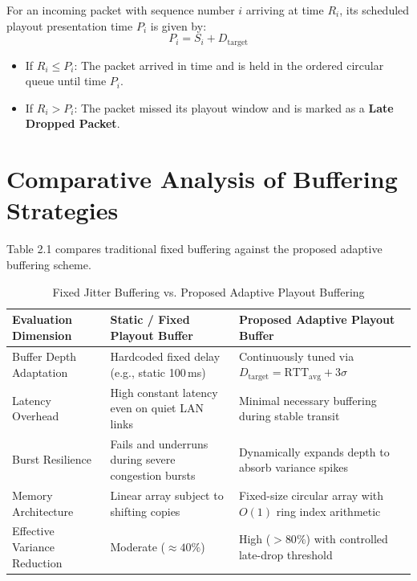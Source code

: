 \documentclass[12pt, a4paper]{report}
\begin{document}
For an incoming packet with sequence number $i$ arriving at time $R_i$, its scheduled playout presentation time $P_i$ is given by:
\begin{equation}
P_i = S_i + D_{\text{target}}
\end{equation}
\begin{itemize}
    \item If $R_i \le P_i$: The packet arrived in time and is held in the ordered circular queue until time $P_i$.
    \item If $R_i > P_i$: The packet missed its playout window and is marked as a \textbf{Late Dropped Packet}.
\end{itemize}

\section{Comparative Analysis of Buffering Strategies}
Table 2.1 compares traditional fixed buffering against the proposed adaptive buffering scheme.

\begin{table}[H]
\centering
\begin{tabularx}{\textwidth}{|p{3.5cm}|L|L|}
\hline
\textbf{Evaluation Dimension} & \textbf{Static / Fixed Playout Buffer} & \textbf{Proposed Adaptive Playout Buffer} \\
\hline
Buffer Depth Adaptation & Hardcoded fixed delay (e.g., static 100\,ms) & Continuously tuned via $D_{\text{target}} = \text{RTT}_{\text{avg}} + 3\sigma$ \\
\hline
Latency Overhead & High constant latency even on quiet LAN links & Minimal necessary buffering during stable transit \\
\hline
Burst Resilience & Fails and underruns during severe congestion bursts & Dynamically expands depth to absorb variance spikes \\
\hline
Memory Architecture & Linear array subject to shifting copies & Fixed-size circular array with $O(1)$ ring index arithmetic \\
\hline
Effective Variance Reduction & Moderate ($\approx 40\%$) & High ($>80\%$) with controlled late-drop threshold \\
\hline
\end{tabularx}
\caption{Fixed Jitter Buffering vs. Proposed Adaptive Playout Buffering}
\label{tab:buffering_comparison}
\end{table}

\newpage
\end{document}
